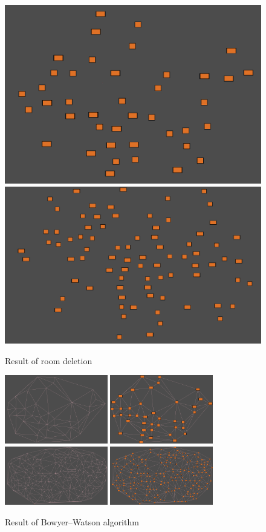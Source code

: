 \documentclass{article}
\begin{document}
\begin{figure}
\centering
\includegraphics[height = 0.3\textwidth]{deleted rooms}
\includegraphics[height = 0.3\textwidth]{deleted rooms1}
\caption{Result of room deletion}
\label{room deletion result}
\end{figure}

\begin{figure}
\centering
\includegraphics[width = 0.4\textwidth]{rooms deluaney triangulation just edges}
\includegraphics[width = 0.4\textwidth]{rooms deluaney triangulation}
\includegraphics[width = 0.4\textwidth]{rooms deluaney triangulation stress test}
\includegraphics[width = 0.4\textwidth]{deluaney triangulation stress test}
\caption{Result of Bowyer–Watson algorithm}
\label{bwa result}
\end{figure}
\end{document}
